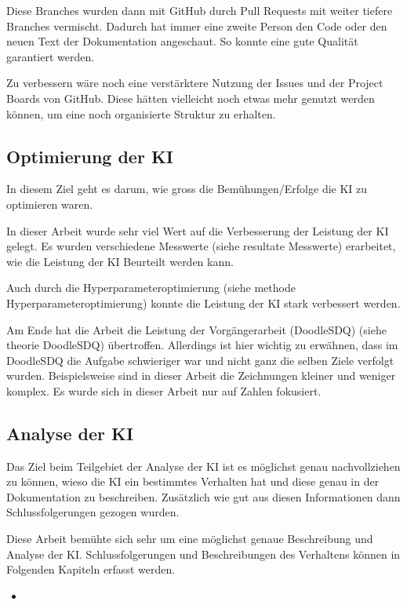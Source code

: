 Diese Branches wurden dann mit GitHub durch Pull Requests mit weiter tiefere
Branches vermischt. Dadurch hat immer eine zweite Person den Code oder den neuen
Text der Dokumentation angeschaut. So konnte eine gute Qualität garantiert
werden.


Zu verbessern wäre noch eine verstärktere Nutzung der Issues und der Project
Boards von GitHub. Diese hätten vielleicht noch etwas mehr genutzt werden
können, um eine noch organisierte Struktur zu erhalten.



\subsection*{Optimierung der KI}
In diesem Ziel geht es darum, wie gross die Bemühungen/Erfolge die KI zu
optimieren waren.

In dieser Arbeit wurde sehr viel Wert auf die Verbesserung der Leistung der KI
gelegt. Es wurden verschiedene Messwerte (siehe resultate Messwerte) erarbeitet,  %
wie die Leistung der KI Beurteilt werden kann.

Auch durch die Hyperparameteroptimierung (siehe methode Hyperparameteroptimierung) %
konnte die Leistung der KI stark verbessert werden.

Am Ende hat die Arbeit die Leistung der Vorgängerarbeit (DoodleSDQ) (siehe theorie  %
DoodleSDQ) übertroffen. Allerdings ist hier wichtig zu erwähnen, dass im
DoodleSDQ die Aufgabe schwieriger war und nicht ganz die selben Ziele verfolgt
wurden. Beispielsweise sind in dieser Arbeit die Zeichnungen kleiner und weniger
komplex. Es wurde sich in dieser Arbeit nur auf Zahlen fokusiert.


\subsection*{Analyse der KI}
Das Ziel beim Teilgebiet der Analyse der KI ist es möglichst genau
nachvollziehen zu können, wieso die KI ein bestimmtes Verhalten hat und diese
genau in der Dokumentation zu beschreiben. Zusätzlich wie gut aus diesen
Informationen dann Schlussfolgerungen gezogen wurden.

Diese Arbeit bemühte sich sehr um eine möglichst genaue Beschreibung und Analyse
der KI. Schlussfolgerungen und Beschreibungen des Verhaltens können in Folgenden Kapiteln erfasst werden.

\begin{itemize}
    \item 
\end{itemize}
